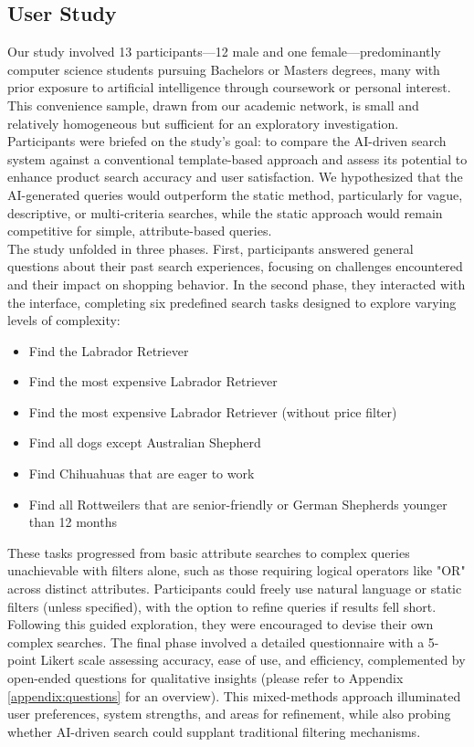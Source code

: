 \documentclass[../../submission.tex]{subfiles}
\begin{document}
\subsection{User Study}
Our study involved 13 participants—12 male and one female—predominantly computer science students pursuing Bachelors or Masters degrees, 
many with prior exposure to artificial intelligence through coursework or personal interest. This convenience sample, drawn from our academic 
network, is small and relatively homogeneous but sufficient for an exploratory investigation. Participants were briefed on the study’s goal: to 
compare the AI-driven search system against a conventional template-based approach and assess its potential to enhance product search accuracy and 
user satisfaction. We hypothesized that the AI-generated queries would outperform the static method, particularly for vague, descriptive, or multi-criteria 
searches, while the static approach would remain competitive for simple, attribute-based queries.\\
The study unfolded in three phases. First, participants answered general questions about their past search experiences, 
focusing on challenges encountered and their impact on shopping behavior. In the second phase, they interacted with the interface, 
completing six predefined search tasks designed to explore varying levels of complexity:
\begin{itemize}
   \item Find the Labrador Retriever
   \item Find the most expensive Labrador Retriever
   \item Find the most expensive Labrador Retriever (without price filter)
   \item Find all dogs except Australian Shepherd
   \item Find Chihuahuas that are eager to work
   \item Find all Rottweilers that are senior-friendly or German Shepherds younger than 12 months
\end{itemize}
These tasks progressed from basic attribute searches to complex queries unachievable with filters alone, 
such as those requiring logical operators like "OR" across distinct attributes. Participants could freely use 
natural language or static filters (unless specified), with the option to refine queries if results fell short. 
Following this guided exploration, they were encouraged to devise their own complex searches. The final phase involved a 
detailed questionnaire with a 5-point Likert scale assessing accuracy, ease of use, and efficiency, complemented by open-ended 
questions for qualitative insights (please refer to Appendix \ref{appendix:questions} for an overview). This mixed-methods approach illuminated user preferences, system strengths, and areas for refinement, 
while also probing whether AI-driven search could supplant traditional filtering mechanisms.
\end{document}
